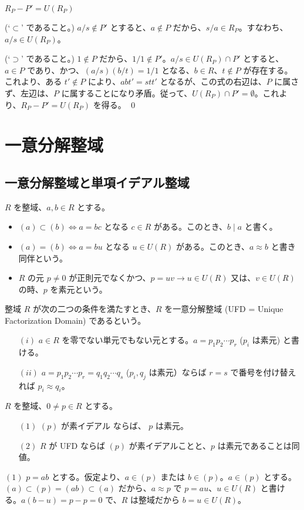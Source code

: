 \smallskip
\underline{$R_P - P' = U(R_P)$}

\pf
(`$\subset$' であること。) $a/s\not\in P'$ とすると、$a\not\in P$ だから、$s/a\in R_P$。すなわち、$a/s\in U(R_P)$。

(`$\supset$' であること。) $1\not\in P$ だから、$1/1\not\in P'$。$a/s\in U(R_P)\cap P'$ とすると、$a\in P$ であり、かつ、$(a/s)(b/t) = 1/1$ となる、$b\in R$、$t\not\in P$ が存在する。これより、ある $t'\not\in P$ により、$abt' = stt'$ となるが、この式の右辺は、$P$ に属さず、左辺は、$P$ に属することになり矛盾。従って、$U(R_P)\cap P' = \emptyset$。これより、$R_P - P' = U(R_P)$ を得る。
\qed

\newpage
\section{一意分解整域}
\subsection{一意分解整域と単項イデアル整域}
$R$ を整域、$a,b\in R$ とする。
\begin{itemize}
\item $(a) \subset (b) \Leftrightarrow a = bc$ となる $c\in R$ がある。このとき、$b\mid a$ と書く。
\item $(a) = (b) \Leftrightarrow a = bu$ となる $u\in U(R)$ がある。このとき、$a\approx b$ と書き同伴という。
\item $R$ の元 $p\neq 0$ が正則元でなくかつ、$p = uv \to u\in U(R)$ 又は、$v\in U(R)$ の時、$p$ を素元という。
\end{itemize}

\begin{definition}
整域 $R$ が次の二つの条件を満たすとき、$R$ を一意分解整域 (UFD = Unique Factorization Domain) であるという。
\begin{itemize}
\item[$(i)$] $a\in R$ を零でない単元でもない元とする。$a = p_1p_2\cdots p_r$ ($p_i$ は素元) と書ける。
\item[$(ii)$] $a = p_1p_2\cdots p_r = q_1q_2\cdots q_s$ ($p_i,q_j$ は素元）ならば $r = s$ で番号を付け替えれば $p_i\approx q_i$。
\end{itemize}
\end{definition}

\begin{prop} \label{prop:ufd:prime}
$R$ を整域、$0\neq p\in R$ とする。
\begin{itemize}
\item[$(1)$] $(p)$ が素イデアル ならば、 $p$ は素元。
\item[$(2)$] $R$ が {\rm UFD} ならば $(p)$ が素イデアルことと、$p$ は素元であることは同値。
\end{itemize}
\end{prop}
\proof
$(1)$ $p = ab$ とする。仮定より、$a\in (p)$ または $b\in (p)$。$a\in (p)$ とする。
$(a)\subset (p) = (ab) \subset (a)$ だから、$a\approx p$ で $p = au$、$u\in U(R)$ と書ける。$a(b - u) = p - p = 0$ で、$R$ は整域だから $b = u\in U(R)$。

